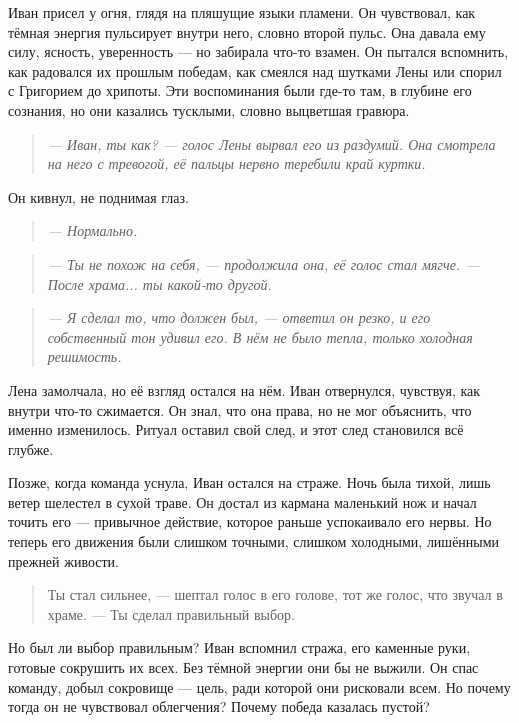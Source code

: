 \documentclass[12pt,a4paper]{book}
\newenvironment{dialogue}{\begin{quote}\itshape}{\end{quote}} %
\begin{document}
Иван присел у огня, глядя на пляшущие языки пламени. Он чувствовал, как тёмная энергия пульсирует внутри него, словно второй пульс. Она давала ему силу, ясность, уверенность --- но забирала что-то взамен. Он пытался вспомнить, как радовался их прошлым победам, как смеялся над шутками Лены или спорил с Григорием до хрипоты. Эти воспоминания были где-то там, в глубине его сознания, но они казались тусклыми, словно выцветшая гравюра.

\begin{dialogue}
--- Иван, ты как? --- голос Лены вырвал его из раздумий. Она смотрела на него с тревогой, её пальцы нервно теребили край куртки.
\end{dialogue}

Он кивнул, не поднимая глаз.

\begin{dialogue}
--- Нормально.
\end{dialogue}

\begin{dialogue}
--- Ты не похож на себя, --- продолжила она, её голос стал мягче. --- После храма... ты какой-то другой.
\end{dialogue}

\begin{dialogue}
--- Я сделал то, что должен был, --- ответил он резко, и его собственный тон удивил его. В нём не было тепла, только холодная решимость.
\end{dialogue}

Лена замолчала, но её взгляд остался на нём. Иван отвернулся, чувствуя, как внутри что-то сжимается. Он знал, что она права, но не мог объяснить, что именно изменилось. Ритуал оставил свой след, и этот след становился всё глубже.

Позже, когда команда уснула, Иван остался на страже. Ночь была тихой, лишь ветер шелестел в сухой траве. Он достал из кармана маленький нож и начал точить его --- привычное действие, которое раньше успокаивало его нервы. Но теперь его движения были слишком точными, слишком холодными, лишёнными прежней живости.

\begin{quote}
Ты стал сильнее, --- шептал голос в его голове, тот же голос, что звучал в храме. --- Ты сделал правильный выбор.
\end{quote}

Но был ли выбор правильным? Иван вспомнил стража, его каменные руки, готовые сокрушить их всех. Без тёмной энергии они бы не выжили. Он спас команду, добыл сокровище --- цель, ради которой они рисковали всем. Но почему тогда он не чувствовал облегчения? Почему победа казалась пустой?
\end{document}
